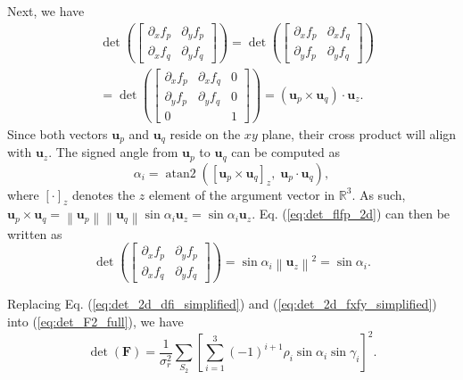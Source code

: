 \documentclass[journal]{IEEEtran}
\newcommand{\norm}[1]{\left\lVert#1\right\rVert}
\def\FIM{\mathbf{F}}
\def\UnitZ{\mathbf{u}_z}
\DeclareMathOperator{\atantwo}{atan2}
\begin{document}
\begin{appendices}
Next, we have
\begin{equation} \label{eq:det_flfp_2d}
\begin{aligned}
    &\det \left(
    \begin{bmatrix}
        \partial_x f_p & \partial_y f_p \\
        \partial_x f_q & \partial_y f_q 
    \end{bmatrix} \right) 
    = \det \left(
    \begin{bmatrix}
        \partial_x f_p & \partial_x f_q \\
        \partial_y f_p & \partial_y f_q 
    \end{bmatrix} \right) \\
    &= \det \left(
    \begin{bmatrix}
        \partial_x f_p  & \partial_x f_q    & 0 \\
        \partial_y f_p  & \partial_y f_q    & 0 \\
        0                   &                       & 1
    \end{bmatrix} \right) 
    = (\mathbf{u}_p \times \mathbf{u}_q) \cdot \UnitZ.
\end{aligned}
\end{equation}
Since both vectors $\mathbf{u}_p$ and $\mathbf{u}_q$ reside on the $xy$ plane, their cross product will align with $\UnitZ$. The signed angle from $\mathbf{u}_p$ to $\mathbf{u}_q$ can be computed as
\begin{equation}
    \alpha_i = \atantwo 
    \left(
    [\mathbf{u}_p \times \mathbf{u}_q]_z, \;
    \mathbf{u}_p \cdot \mathbf{u}_q
    \right),
\end{equation}
where $[\cdot]_z$ denotes the $z$ element of the argument vector in $\mathbb{R}^3$. As such, 
$\mathbf{u}_p \times \mathbf{u}_q
= \norm{\mathbf{u}_p} \norm{\mathbf{u}_q} \sin\alpha_i \UnitZ 
= \sin\alpha_i \UnitZ$.
Eq. (\ref{eq:det_flfp_2d}) can then be written as
\begin{equation} \label{eq:det_2d_fxfy_simplified}
    \det \left(
    \begin{bmatrix}
        \partial_x f_p & \partial_y f_p \\
        \partial_x f_q & \partial_y f_q 
    \end{bmatrix} \right) 
    = \sin\alpha_i \norm{\UnitZ}^2 
    = \sin\alpha_i.
\end{equation}

Replacing Eq. (\ref{eq:det_2d_dfi_simplified}) and (\ref{eq:det_2d_fxfy_simplified}) into (\ref{eq:det_F2_full}), we have
\begin{equation}
    \det(\FIM) = 
    \frac{1}{\sigma_r^2} \sum\limits_{S_2}^{}
    \left[
    \sum\limits_{i=1}^{3}
    (-1)^{i+1}
    \rho_i
    \sin{\alpha_i}
    \sin{\gamma_i}
    \right]^2.
\end{equation}


\end{appendices}
\end{document}
